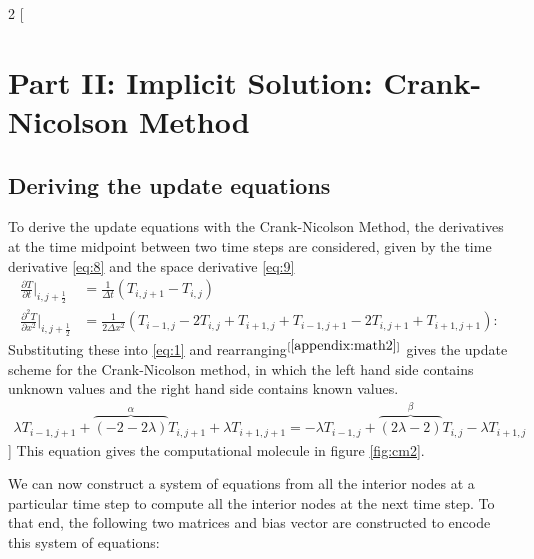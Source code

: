 \documentclass[a4paper]{article} %
\begin{document}
\begin{multicols}{2}
[
\section{Part II: Implicit Solution: Crank-Nicolson Method}
\subsection{Deriving the update equations}
To derive the update equations with the Crank-Nicolson Method, the derivatives at the time midpoint between two time steps are considered, given by the time derivative \eqref{eq:8} and the space derivative \eqref{eq:9}
\begin{align}
\frac{\partial T}{\partial t}\bigg\rvert_{i,j+\frac 1 2} &= \frac{1}{\Delta t} (T_{i,j+1} - T_{i,j}) \label{eq:8}\\
\frac{\partial^2 T}{\partial x^2}\bigg\rvert_{i,j+\frac 1 2} &= \frac{1}{2\Delta x^2}(T_{i-1,j} - 2T_{i,j} + T_{i+1,j} + T_{i-1,j+1} - 2T_{i,j+1} + T_{i+1,j+1}) \label{eq:9}:
\end{align}
Substituting these into \eqref{eq:1} and rearranging$^{[\ref{appendix:math2}]}$ gives the update scheme for the Crank-Nicolson method, in which the left hand side contains unknown values and the right hand side contains known values.
\begin{align}
\lambda T_{i-1,j+1} + \overbrace{(- 2 - 2\lambda)}^{\alpha}T_{i,j+1} + \lambda T_{i+1,j+1} = -\lambda T_{i-1,j} + \overbrace{(2\lambda - 2)}^{\beta} T_{i,j} - \lambda T_{i+1,j} \label{eq:10}
\end{align}
]
This equation gives the computational molecule in figure \ref{fig:cm2}.

We can now construct a system of equations from all the interior nodes at a particular time step to compute all the interior nodes at the next time step. To that end, the following two matrices and bias vector are constructed to encode this system of equations:

\columnbreak

\begin{figure}[H]
    \centering
{}
\end{figure}
\end{multicols}
\end{document}
